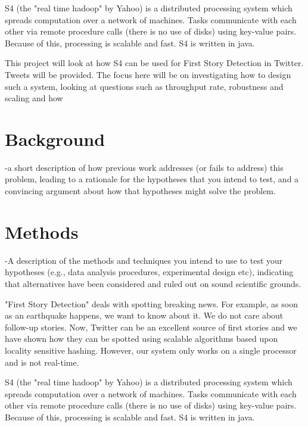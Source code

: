 \documentclass[a4paper,12pt]{article}
\begin{document}
S4 (the "real time hadoop" by Yahoo) is a distributed processing system which spreads computation over a network of machines. Tasks communicate with each other via remote procedure calls (there is no use of disks) using key-value pairs. Because of this, processing is scalable and fast. S4 is written in java.

This project will look at how S4 can be used for First Story Detection in Twitter. Tweets will be provided. The focus here will be on investigating how to design such a system, looking at questions such as throughput rate, robustness and scaling and how





\section{Background}

-a short description of how previous work addresses (or fails to address) this problem, leading to a rationale for the hypotheses that you intend to test, and a convincing argument about how that hypotheses might solve the problem.





\section{Methods}

-A description of the methods and techniques you intend to use to test your hypotheses (e.g., data analysis procedures, experimental design etc), indicating that alternatives have been considered and ruled out on sound scientific grounds.

"First Story Detection" deals with spotting breaking news. For example, as soon as an earthquake happens, we want to know about it. We do not care about follow-up stories. Now, Twitter can be an excellent source of first stories and we have shown how they can be spotted using scalable algorithms based upon locality sensitive hashing. However, our system only works on a single processor and is not real-time.

S4 (the "real time hadoop" by Yahoo) is a distributed processing system which spreads computation over a network of machines. Tasks communicate with each other via remote procedure calls (there is no use of disks) using key-value pairs. Because of this, processing is scalable and fast. S4 is written in java.
\end{document}
